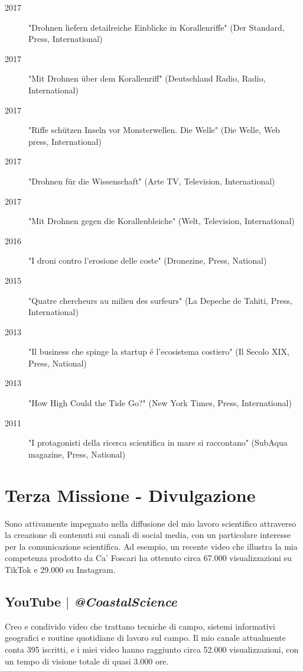 \documentclass[11pt]{article}
\begin{document}
{\begin{description}
  \item [2017] "Drohnen liefern detailreiche Einblicke in Korallenriffe" (Der Standard, Press, International) 
  \item [2017] "Mit Drohnen über dem Korallenriff" (Deutschland Radio, Radio, International) 
  \item [2017] "Riffe schützen Inseln vor Monsterwellen. Die Welle" (Die Welle, Web press, International) 
  \item [2017] "Drohnen für die Wissenschaft" (Arte TV, Television, International) 
  \item [2017] "Mit Drohnen gegen die Korallenbleiche" (Welt, Television, International) 
  \item [2016] "I droni contro l’erosione delle coste" (Dronezine, Press, National) 
  \item [2015] "Quatre chercheurs au milieu des surfeurs" (La Depeche de Tahiti, Press, International) 
  \item [2013] "Il business che spinge la startup é l’ecosistema costiero" (Il Secolo XIX, Press, National) 
  \item [2013] "How High Could the Tide Go?" (New York Times, Press, International) 
  \item [2011] "I protagonisti della ricerca scientifica in mare si raccontano" (SubAqua magazine, Press, National) 
\end{description}}

\section{Terza Missione - Divulgazione}
{\normalfont Sono attivamente impegnato nella diffusione del mio lavoro scientifico attraverso la creazione di contenuti sui canali di social media, con un particolare interesse per la comunicazione scientifica. Ad esempio, un recente video che illustra la mia competenza prodotto da Ca' Foscari ha ottenuto circa 67.000 visualizzazioni su TikTok e 29.000 su Instagram.}\\

\bigskip

\subsection{YouTube $|$ {\normalfont\textit{@CoastalScience}}}
{\footnotesize Creo e condivido video che trattano tecniche di campo, sistemi informativi geografici e routine quotidiane di lavoro sul campo. Il mio canale attualmente conta 395 iscritti, e i miei video hanno raggiunto circa 52.000 visualizzazioni, con un tempo di visione totale di quasi 3.000 ore.}
\bigskip
\end{document}

